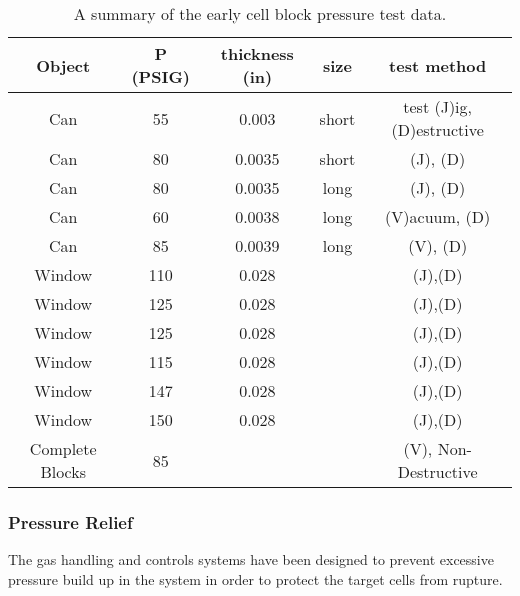 \begin{safetyen}{10}{5}
\begin{table}[htb]
\begin{center}
\begin{tabular}{|c|c|c|c|c|} \hline
Object & P (PSIG) & thickness (in) & size & test method \\ \hline
Can & 55  & 0.003 &short &test (J)ig, (D)estructive \\ \hline
Can & 80 & 0.0035 &short &(J), (D) \\ \hline
Can & 80 & 0.0035 &long &(J), (D) \\ \hline
Can & 60 & 0.0038 &long &(V)acuum, (D) \\ \hline
Can & 85 & 0.0039 &long &(V), (D) \\ \hline
Window & 110 &0.028& &(J),(D) \\ \hline
Window & 125 &0.028& &(J),(D) \\ \hline
Window & 125 &0.028& &(J),(D) \\ \hline
Window & 115 &0.028& &(J),(D) \\ \hline
Window & 147 &0.028& &(J),(D) \\ \hline
Window & 150 &0.028& &(J),(D) \\ \hline
Complete Blocks & 85 &&&(V), Non-Destructive \\ \hline
\end{tabular}
\end{center}
\caption[Cryotarget: Cell Pressure Test Data]{A summary of the early cell block pressure test data.}
\label{ta:test}
\end{table}

\subsubsection{ Pressure Relief}

The gas handling and controls systems have been designed to 
prevent excessive pressure build up in the system in order to
protect the target cells from rupture.


\end{safetyen}
